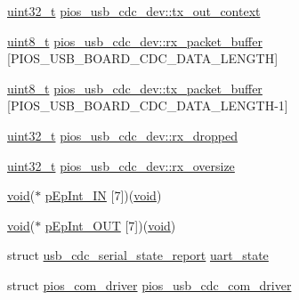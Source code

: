 \begin{DoxyCompactItemize}
\item 
\hyperlink{stdint_8h_a435d1572bf3f880d55459d9805097f62}{uint32\-\_\-t} \hyperlink{group___p_i_o_s___u_s_b___c_o_m_ga81d00c55fe107bb853a8629706b0acb4}{pios\-\_\-usb\-\_\-cdc\-\_\-dev\-::tx\-\_\-out\-\_\-context}
\item 
\hyperlink{stdint_8h_aba7bc1797add20fe3efdf37ced1182c5}{uint8\-\_\-t} \hyperlink{group___p_i_o_s___u_s_b___c_o_m_ga82f6a571f9bf92fae2d7368be2407a27}{pios\-\_\-usb\-\_\-cdc\-\_\-dev\-::rx\-\_\-packet\-\_\-buffer} \mbox{[}P\-I\-O\-S\-\_\-\-U\-S\-B\-\_\-\-B\-O\-A\-R\-D\-\_\-\-C\-D\-C\-\_\-\-D\-A\-T\-A\-\_\-\-L\-E\-N\-G\-T\-H\mbox{]}
\item 
\hyperlink{stdint_8h_aba7bc1797add20fe3efdf37ced1182c5}{uint8\-\_\-t} \hyperlink{group___p_i_o_s___u_s_b___c_o_m_ga1b086465e042517001948516cfa908d1}{pios\-\_\-usb\-\_\-cdc\-\_\-dev\-::tx\-\_\-packet\-\_\-buffer} \mbox{[}P\-I\-O\-S\-\_\-\-U\-S\-B\-\_\-\-B\-O\-A\-R\-D\-\_\-\-C\-D\-C\-\_\-\-D\-A\-T\-A\-\_\-\-L\-E\-N\-G\-T\-H-\/1\mbox{]}
\item 
\hyperlink{stdint_8h_a435d1572bf3f880d55459d9805097f62}{uint32\-\_\-t} \hyperlink{group___p_i_o_s___u_s_b___c_o_m_gaf423c6fd8c8e8d95b5dc5d9242df40da}{pios\-\_\-usb\-\_\-cdc\-\_\-dev\-::rx\-\_\-dropped}
\item 
\hyperlink{stdint_8h_a435d1572bf3f880d55459d9805097f62}{uint32\-\_\-t} \hyperlink{group___p_i_o_s___u_s_b___c_o_m_ga88576a84665e4d9b17001b7cb5efebc6}{pios\-\_\-usb\-\_\-cdc\-\_\-dev\-::rx\-\_\-oversize}
\item 
\hyperlink{group___n_a_m_e_ga18028b8badbf1ea7e704ccac3c488e82}{void}($\ast$ \hyperlink{group___p_i_o_s___u_s_b___c_o_m_ga0992c19a0f2e317fcd93f755d316a0fd}{p\-Ep\-Int\-\_\-\-I\-N} \mbox{[}7\mbox{]})(\hyperlink{group___n_a_m_e_ga18028b8badbf1ea7e704ccac3c488e82}{void})
\item 
\hyperlink{group___n_a_m_e_ga18028b8badbf1ea7e704ccac3c488e82}{void}($\ast$ \hyperlink{group___p_i_o_s___u_s_b___c_o_m_ga549396ff4348c565f52117dd27ad52ca}{p\-Ep\-Int\-\_\-\-O\-U\-T} \mbox{[}7\mbox{]})(\hyperlink{group___n_a_m_e_ga18028b8badbf1ea7e704ccac3c488e82}{void})
\item 
struct \hyperlink{structusb__cdc__serial__state__report}{usb\-\_\-cdc\-\_\-serial\-\_\-state\-\_\-report} \hyperlink{group___p_i_o_s___u_s_b___c_o_m_gaf7f356f1ada9744b2424b2980baa2a81}{uart\-\_\-state}
\item 
struct \hyperlink{structpios__com__driver}{pios\-\_\-com\-\_\-driver} \hyperlink{group___p_i_o_s___u_s_b___c_o_m_gad661bf144c28ea36f290b0092e6957e2}{pios\-\_\-usb\-\_\-cdc\-\_\-com\-\_\-driver}

\end{DoxyCompactItemize}
